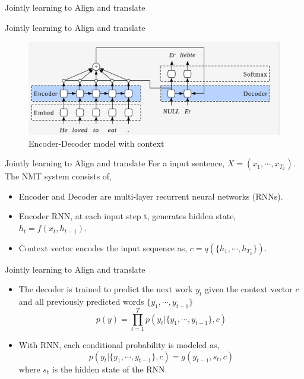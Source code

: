 ﻿\documentclass[table,aspectratio=43,mathserif,xcolor={usenames,dvipsnames,svgnames,table},10pt]{beamer}
\begin{document}
\begin{section}{Jointly learning to Align and translate}
\end{section}
\begin{frame}{Jointly learning to Align and translate}
\begin{figure}[h]
    \includegraphics[width=0.9\linewidth]{images/context.png}  
    \caption{Encoder-Decoder model with context}
  \end{figure}
\end{frame}

\begin{frame}{Jointly learning to Align and translate}
For a input sentence, $X = (x_1,\cdots, x_{T_{x}} )$. The NMT 
system consists of,
  \begin{itemize}
   \item<+-> Encoder and Decoder are multi-layer recurrent neural networks (RNNs).
   \item<+-> Encoder RNN, at each input step t, generates hidden state, $h_t = f(x_t, h_{t-1})$.
   \item<+-> Context vector encodes the input sequence as, $c = q(\{h_1,\cdots,h_{T_x}\})$.
  \end{itemize}
\end{frame}

\begin{frame}{Jointly learning to Align and translate}
\begin{itemize}
 \item The decoder is trained to predict the next work $y_t$ given the context vector $c$ and all previously predicted words $\{ y_1, \cdots, y_{t-1}\}$
 $$ p(y) = \prod^{T}_{t=1} p(y_t | \{ y_1, \cdots, y_{t-1}\} ,c ) $$
 \item With RNN, each conditional probability is modeled as,
 $$ p(y_t | \{ y_1, \cdots, y_{t-1}\}, c) = g(y_{t-1}, s_t, c) $$ where $s_t$ is the hidden state of the RNN.
 \end{itemize}

\end{frame}
\end{document}
